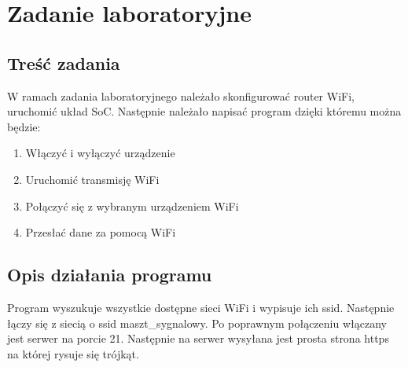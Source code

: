 \documentclass{article}
\begin{document}
    \section{Zadanie laboratoryjne}
        \subsection{Treść zadania}
            W ramach zadania laboratoryjnego należało skonfigurować router WiFi, uruchomić układ SoC.
            Następnie należało napisać program dzięki któremu można będzie:
            \begin{enumerate}
                \item Włączyć i wyłączyć urządzenie
                \item Uruchomić transmisję WiFi
                \item Połączyć się z wybranym urządzeniem WiFi
                \item Przesłać dane za pomocą WiFi
            \end{enumerate}
        \subsection{Opis działania programu}
            Program wyszukuje wszystkie dostępne sieci WiFi i wypisuje ich ssid. Następnie łączy się 
            z siecią o ssid maszt\_sygnalowy. Po poprawnym połączeniu włączany jest serwer na porcie 21.
            Następnie na serwer wysyłana jest prosta strona https na której rysuje się trójkąt.
\end{document}
